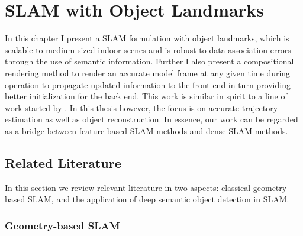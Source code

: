 \chapter{SLAM with Object Landmarks} \label{chap:object-slam}

In this chapter I present a SLAM formulation with object landmarks, which is scalable to medium sized indoor scenes and is robust to data association errors through the use of semantic information. Further I also present a compositional rendering method to render an accurate model frame at any given time during operation to propagate updated information to the front end in turn providing better initialization for the back end. This work is similar in spirit to a line of work started by \cite{salas-morenoSLAMSimultaneousLocalisation2013}. In this thesis however, the focus is on accurate trajectory estimation as well as object reconstruction. In essence, our work can be regarded as a bridge between feature based SLAM methods and dense SLAM methods.

\section{Related Literature}

In this section we review relevant literature in two aspects: classical geometry-based SLAM, and the application of deep semantic object detection in SLAM.

\subsection{Geometry-based SLAM}

